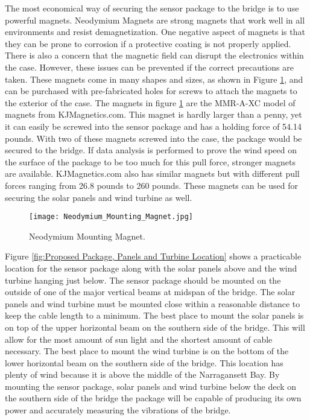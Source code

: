 The most economical way of securing the sensor package to the bridge is to use powerful magnets. Neodymium Magnets are strong magnets that work well in
all environments and resist demagnetization. One negative aspect of magnets is that they can be prone to corrosion if a protective coating is not
properly applied. There is also a concern that the magnetic field can disrupt the electronics within the case. However, these issues can be prevented if
the correct precautions are taken. These magnets come in many shapes and sizes, as shown in Figure \ref{fig:Mounting Magnet}, and can be purchased with
pre-fabricated holes for screws to attach the magnets to the exterior of the case. The magnets in figure \ref{fig:Mounting Magnet} are the MMR-A-XC
model of magnets from KJMagnetics.com. This magnet is hardly larger than a penny, yet it can easily be screwed into the sensor package and has a
holding force of 54.14 pounds. With two of these magnets screwed into the case, the package would be secured to the bridge. If data analysis is
performed to prove the wind speed on the surface of the package to be too much for this pull force, stronger magnets are available. KJMagnetics.com
also has similar magnets but with different pull forces ranging from 26.8 pounds to 260 pounds. These magnets can be used for securing the solar
panels and wind turbine as well. 

\begin{figure}[ht]
\centering
\texttt{[image: Neodymium\_Mounting\_Magnet.jpg]}
\caption{Neodymium Mounting Magnet.}
\label{fig:Mounting Magnet}
\end{figure}

Figure \ref{fig:Proposed Package, Panels and Turbine Location} shows a practicable location for the sensor package along with the solar panels above and
the wind turbine hanging just below. The sensor package should be mounted on the outside of one of the major vertical beams at midspan of the bridge. The
solar panels and wind turbine must be mounted close within a reasonable distance to keep the cable length to a minimum. The best place to mount the
solar panels is on top of the upper horizontal beam on the southern side of the bridge. This will allow for the most amount of sun light and the
shortest amount of cable necessary. The best place to mount the wind turbine is on the bottom of the lower horizontal beam on the southern side of the
bridge. This location has plenty of wind because it is above the middle of the Narragansett Bay. By mounting the sensor package, solar panels and
wind turbine below the deck on the southern side of the bridge the package will be capable of producing its own power and accurately measuring the
vibrations of the bridge.


